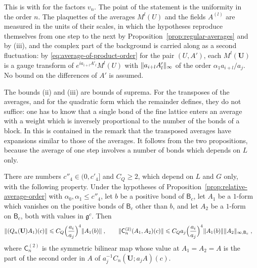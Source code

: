 \documentclass[11pt]{preprint}
\DeclarePairedDelimiter{\norm}{\lVert}{\rVert}
\numberwithin{equation}{section}
\begin{document}
This is \cite[Propositions~4--7, pp.~38--43]{BalabanAVG} with \cite[(88), (92), (97), (99), pp.~31--32]{BalabanAVG} for the factors $v_n$. The point of the statement is the uniformity in the order $n$. The plaquettes of the averages $M^l(U)$ and the fields $A^{(l)}$ are measured in the units of their scales, in which the hypotheses reproduce themselves from one step to the next by Proposition~\ref{prop:regular-averages} and by (iii), and the complex part of the background is carried along as a second fluctuation: by \eqref{eq:average-of-product-order} for the pair $(U, A')$, each $M^l(\mathbf U)$ is a gauge transform of $e^{ia_{i+l}A'_l}M^l(U)$ with $\norm{a_{i+l}A'_l}_\infty$ of the order $\alpha_1a_{i+l}/a_j$. No bound on the differences of $A'$ is assumed.

The bounds (ii) and (iii) are bounds of suprema. For the transposes of the averages, and for the quadratic form which the remainder defines, they do not suffice: one has to know that a single bond of the fine lattice enters an average with a weight which is inversely proportional to the number of the bonds of a block. In \cite[p.~406]{BalabanPBG} this is contained in the remark that the transposed averages have expansions similar to those of the averages. It follows from the two propositions, because the average of one step involves a number of bonds which depends on $L$ only.

\begin{lemma}\label{lem:average-kernels}
There are numbers $c''_4 \in (0, c'_4]$ and $C_Q \geqslant 2$, which depend on $L$ and $G$ only, with the following property. Under the hypotheses of Proposition~\ref{prop:relative-average-order} with $\alpha_0, \alpha_1 \leqslant c''_4$, let $b$ be a positive bond of $\mathsf B_c$, let $A_1$ be a $1$-form which vanishes on the positive bonds of $\mathsf B_c$ other than $b$, and let $A_2$ be a $1$-form on $\mathsf B_c$, both with values in $\mathfrak g^c$. Then
\begin{equation}\label{eq:average-kernels}
    \norm{(Q_n(\mathbf U)A_1)(c)} \leqslant C_Q\Bigl(\frac{a_i}{a_j}\Bigr)^4\norm{A_1(b)}\;,
    \qquad
    \norm{\mathsf C^{(2)}_n(A_1, A_2)(c)} \leqslant C_Qa_j\Bigl(\frac{a_i}{a_j}\Bigr)^4\norm{A_1(b)}\norm{A_2}_{\infty,\mathsf B_c}\;,
\end{equation}
where $\mathsf C^{(2)}_n$ is the symmetric bilinear map whose value at $A_1 = A_2 = A$ is the part of the second order in $A$ of $a_j^{-1}C_n(\mathbf U; a_jA)(c)$.
\end{lemma}
\end{document}
